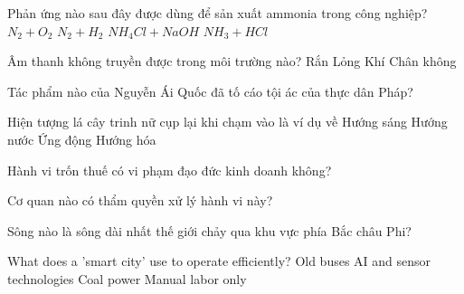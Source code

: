 \begin{ex}
    Phản ứng nào sau đây được dùng để sản xuất ammonia trong công nghiệp?
    \choice
    {$N_2 + O_2$}
    {\True $N_2 + H_2$}
    {$NH_4Cl + NaOH$}
    {$NH_3 + HCl$}

\end{ex}
\begin{ex}
    Âm thanh không truyền được trong môi trường nào?
    \choice
    {Rắn}
    {Lỏng}
    {Khí}
    {\True Chân không}

\end{ex}
\begin{ex}
    Tác phẩm nào của Nguyễn Ái Quốc đã tố cáo tội ác của thực dân Pháp?
\end{ex}
\begin{ex}
    Hiện tượng lá cây trinh nữ cụp lại khi chạm vào là ví dụ về
    \choice
    {Hướng sáng}
    {Hướng nước}
    {\True Ứng động}
    {Hướng hóa}

\end{ex}
\begin{ex}
    \begin{chc}
        Hành vi trốn thuế có vi phạm đạo đức kinh doanh không?
    \end{chc}
    \begin{chc}
        Cơ quan nào có thẩm quyền xử lý hành vi này?
    \end{chc}
\end{ex}
\begin{ex}
    Sông nào là sông dài nhất thế giới chảy qua khu vực phía Bắc châu Phi?
\end{ex}
\begin{ex}
    What does a 'smart city' use to operate efficiently?
    \choice
    {Old buses}
    {\True AI and sensor technologies}
    {Coal power}
    {Manual labor only}

\end{ex}
